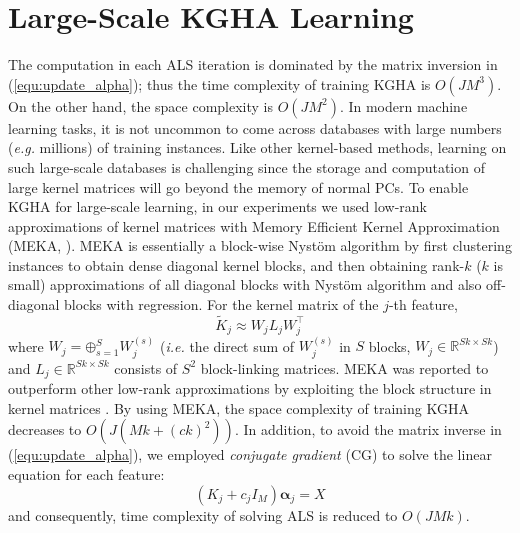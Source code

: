 \documentclass[a4paper]{article}
\begin{document}
\section{Large-Scale KGHA Learning}
\label{sec:large_scale}
The computation in each ALS iteration is dominated by the matrix inversion in (\ref{equ:update_alpha});
thus the time complexity of training KGHA is $O(JM^3)$. 
On the other hand, the space complexity is $O(JM^2)$. 
In modern machine learning tasks, it is not uncommon to come across databases with large numbers (\emph{e.g.} millions) of training instances. 
Like other kernel-based methods, learning on such large-scale databases is challenging since the storage and computation of large kernel matrices          
will go beyond the memory of normal PCs. To enable KGHA for large-scale learning, in our experiments we used low-rank approximations of kernel matrices with  
Memory Efficient Kernel Approximation (MEKA, \citeauthor{BlockNystrom}\citeyear{BlockNystrom}). MEKA is essentially a block-wise Nyst{\"o}m algorithm by first clustering 
instances to obtain dense diagonal kernel blocks, and then obtaining rank-$k$ ($k$ is small) approximations of all diagonal blocks with Nyst{\"o}m algorithm and also off-diagonal blocks
with regression. For the kernel matrix of the $j$-th 
feature, 
\begin{equation}
    \tilde{K}_j\approx W_j L_j W_j^\top
\end{equation}
where $W_j=\boldsymbol{\oplus}_{s=1}^S W_j^{(s)}$ (\emph{i.e.} the direct sum of $W_j^{(s)}$ in $S$ blocks, $W_j\in\mathbb{R}^{Sk\times Sk}$)
and $L_j\in\mathbb{R}^{Sk\times Sk}$ consists of $S^2$ block-linking matrices. 
MEKA was reported 
to outperform other low-rank approximations by exploiting the block structure in kernel matrices \citep{BlockNystrom}.  
By using MEKA, the space complexity of training KGHA decreases to $O(J(Mk+(ck)^2))$. 
In addition, to avoid the matrix inverse in (\ref{equ:update_alpha}), we employed \emph{conjugate gradient} (CG) to solve the linear equation for each feature: 
\begin{equation}
    (K_j+c_j I_M)\boldsymbol{\alpha}_j=X 
    \label{equ:linear_equation}
\end{equation}
and consequently, time complexity of solving ALS is reduced to $O(JMk)$.   
\end{document}
